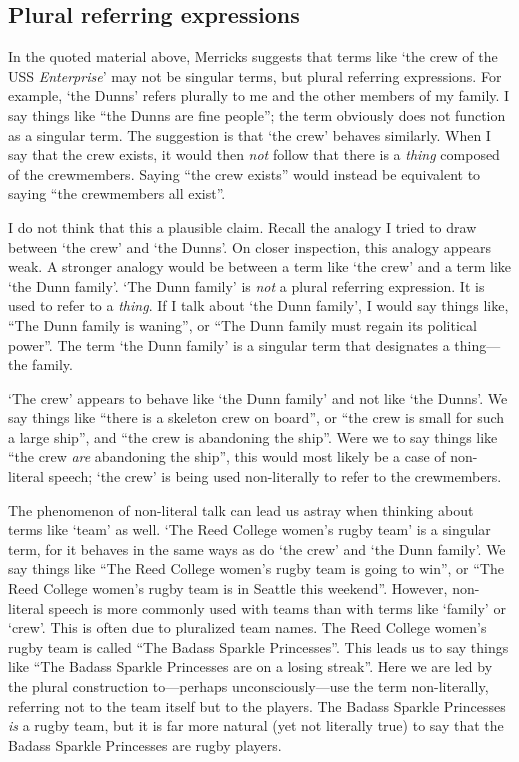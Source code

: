 \documentclass[11pt]{article}
\begin{document}
\begin{spacing}{1.25}
\subsection{Plural referring expressions}
In the quoted material above, Merricks suggests that terms like `the
crew of the USS {\em Enterprise}' may not be singular terms, but
plural referring expressions.  For example, `the Dunns' refers
plurally to me and the other members of my family.  I say things like
``the Dunns are fine people''; the term obviously does not function as
a singular term.  The suggestion is that `the crew' behaves similarly.
When I say that the crew exists, it would then {\em not} follow that
there is a {\em thing} composed of the crewmembers.  Saying ``the crew
exists'' would instead be equivalent to saying ``the crewmembers all
exist''.

I do not think that this a plausible claim.  Recall the analogy I
tried to draw between `the crew' and `the Dunns'.  On closer
inspection, this analogy appears weak.  A stronger analogy would be
between a term like `the crew' and a term like `the Dunn family'.
`The Dunn family' is {\em not} a plural referring expression.  It is
used to refer to a {\em thing}.  If I talk about `the Dunn family', I
would say things like, ``The Dunn family is waning'', or ``The Dunn
family must regain its political power''.  The term `the Dunn family'
is a singular term that designates a thing---the family.

`The crew' appears to behave like `the Dunn family' and not like `the
Dunns'.  We say things like ``there is a skeleton crew on board'', or
``the crew is small for such a large ship'', and ``the crew is
abandoning the ship''.  Were we to say things like ``the crew {\em
  are} abandoning the ship'', this would most likely be a case of
non-literal speech; `the crew' is being used non-literally to refer to
the crewmembers.

The phenomenon of non-literal talk can lead us astray when thinking
about terms like `team' as well.  `The Reed College women's rugby
team' is a singular term, for it behaves in the same ways as do `the
crew' and `the Dunn family'.  We say things like ``The Reed College
women's rugby team is going to win'', or ``The Reed College women's
rugby team is in Seattle this weekend''.  However, non-literal speech
is more commonly used with teams than with terms like `family' or
`crew'.  This is often due to pluralized team names.  The Reed College
women's rugby team is called ``The Badass Sparkle Princesses''.  This
leads us to say things like ``The Badass Sparkle Princesses are on a
losing streak''.  Here we are led by the plural construction
to---perhaps unconsciously---use the term non-literally, referring not
to the team itself but to the players.  The Badass Sparkle Princesses
{\em is} a rugby team, but it is far more natural (yet not literally
true) to say that the Badass Sparkle Princesses are rugby players.


\end{spacing}
\end{document}
